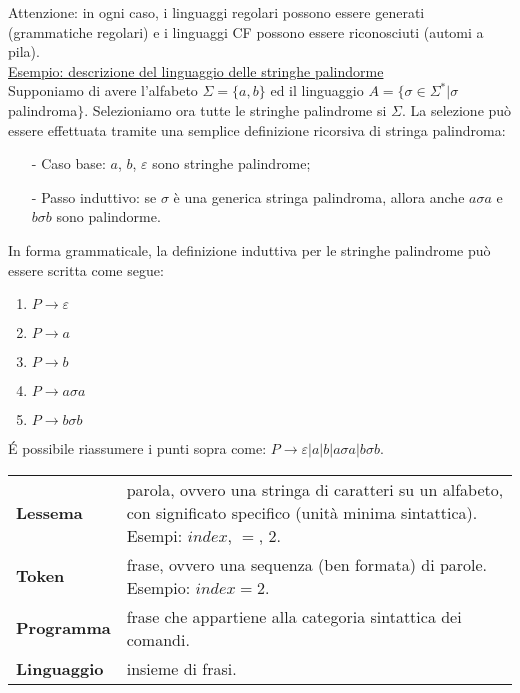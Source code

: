 \documentclass[a4paper, 10pt]{report}
\begin{document}
\noindent Attenzione: in ogni caso, i  linguaggi regolari  possono  essere  generati  (grammatiche  regolari)  e i linguaggi CF possono essere riconosciuti (automi a pila).\\

\noindent \underline{Esempio: descrizione del linguaggio delle stringhe palindorme}\\

\noindent Supponiamo di avere l'alfabeto $\Sigma = \{a ,b\}$ ed il linguaggio $A = \{\sigma \in \Sigma^* | \sigma$ palindroma$\}$.
Selezioniamo ora tutte le stringhe palindrome si $\Sigma$. La selezione può essere effettuata tramite una semplice definizione ricorsiva di stringa palindroma:

\begin{itemize}
\item[-]Caso base: $a$, $b$, $\varepsilon$ sono stringhe palindrome;
\item[-]Passo induttivo: se $\sigma$ è una generica stringa palindroma, allora anche $a\sigma a$ e $b\sigma b$ sono palindorme.
\end{itemize}

\noindent In forma grammaticale, la definizione induttiva per le stringhe palindrome può essere scritta come segue:

\begin{enumerate}
\item $P \rightarrow \varepsilon$
\item $P \rightarrow a$
\item $P \rightarrow b$
\item $P \rightarrow a \sigma a$
\item $P \rightarrow b \sigma b$
\end{enumerate}

\noindent É possibile riassumere i punti sopra come: $P \rightarrow \varepsilon|a|b|a \sigma a|b \sigma b$.\\

\begin{tcolorbox}[title=\textbf{Terminologia}]
\begin{tabular}{lp{}}
\textbf{Lessema} &   parola, ovvero una stringa di caratteri su un alfabeto, con significato specifico (unità minima sintattica). Esempi: $index$, $=$, $2$.\\
\textbf{Token} & frase, ovvero una sequenza (ben formata) di parole. Esempio: $index = 2$.\\
\textbf{Programma} & frase che appartiene alla categoria sintattica dei comandi.\\
\textbf{Linguaggio} & insieme di frasi.\\
\end{tabular}
\end{tcolorbox}
\end{document}
